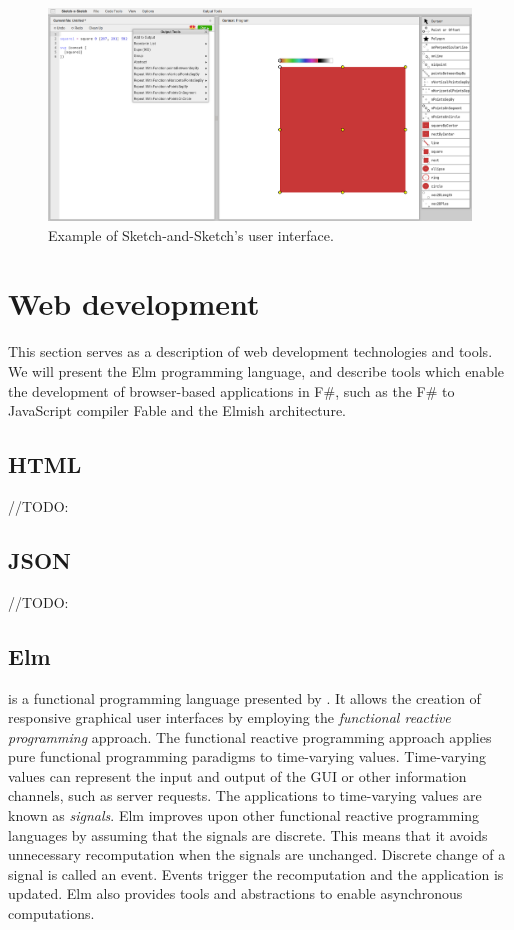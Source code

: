 \begin{figure}
	\centering
	\includegraphics[width=1\linewidth]{img/sketch.pdf}
	\caption{Example of Sketch-and-Sketch's user interface. }
	\label{fig:sketch}
\end{figure}

\section{Web development}

This section serves as a description of web development technologies and tools.
We will present the Elm programming language,
and describe tools which enable the development of browser-based applications in F\#, such as the F\# to JavaScript compiler Fable and the Elmish architecture.

\subsection{HTML}
//TODO:
\subsection{JSON}
//TODO:

\subsection{Elm}
\citet{eml} is a functional programming language presented by \citet{Czaplicki_Chong_2013}.
It allows the creation of responsive graphical user interfaces by employing the
\emph{functional reactive programming} approach. The functional reactive programming
approach applies pure functional programming paradigms to time-varying values.
Time-varying values can represent the input and output of the GUI or other information
channels, such as server requests. The applications to time-varying values are known
as \emph{signals}. Elm improves upon other functional reactive programming languages
by assuming that the signals are discrete. This means that it avoids unnecessary
recomputation when the signals are unchanged. Discrete change of a signal is called
an event. Events trigger the recomputation and the application is updated. Elm also
provides tools and abstractions to enable asynchronous computations.

